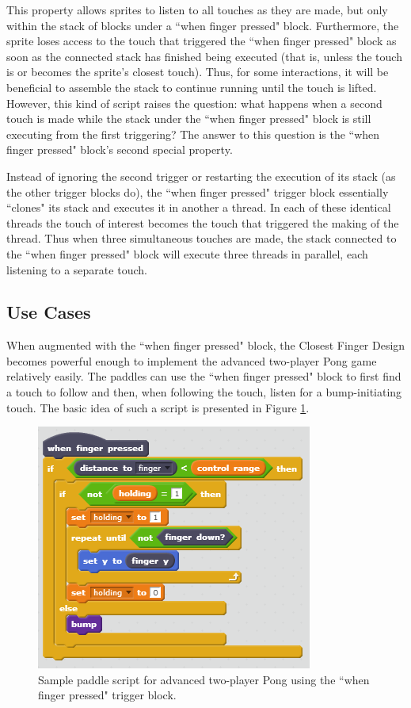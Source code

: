 This property allows sprites to listen to all touches as they are made, but only within the stack of blocks under a ``when finger pressed" block. Furthermore, the sprite loses access to the touch that triggered the ``when finger pressed" block as soon as the connected stack has finished being executed (that is, unless the touch is or becomes the sprite's closest touch). Thus, for some interactions, it will be beneficial to assemble the stack to continue running until the touch is lifted. However, this kind of script raises the question: what happens when a second touch is made while the stack under the ``when finger pressed" block is still executing from the first triggering? The answer to this question is the ``when finger pressed" block's second special property.

Instead of ignoring the second trigger or restarting the execution of its stack (as the other trigger blocks do), the ``when finger pressed" trigger block essentially ``clones" its stack and executes it in another a thread. In each of these identical threads the touch of interest becomes the touch that triggered the making of the thread. Thus when three simultaneous touches are made, the stack connected to the ``when finger pressed" block will execute three threads in parallel, each listening to a separate touch.
 
\subsection{Use Cases}

When augmented with the ``when finger pressed" block, the Closest Finger Design becomes powerful enough to implement the advanced two-player Pong game relatively easily. The paddles can use the ``when finger pressed" block to first find a touch to follow and then, when following the touch, listen for a bump-initiating touch. The basic idea of such a script is presented in Figure \ref{AdvancedTwoPlayerPongCFD}.

\begin{figure}
\centering
\includegraphics{images/AdvancedTwoPlayerPongCFD.PNG}
\caption[Sample Script For Advanced Two-Player Pong Using the Closest Finger Design Extension]{Sample paddle script for advanced two-player Pong using the ``when finger pressed" trigger block.}
\label{AdvancedTwoPlayerPongCFD}
\end{figure}

